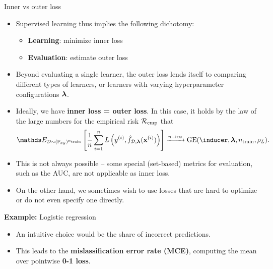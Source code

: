 \begin{vbframe}{Inner vs outer loss}

\begin{itemize}
  \item Supervised learning thus implies the following dichotomy:
  \begin{itemize}
    \item \textbf{Learning}: minimize inner loss
    \item \textbf{Evaluation}: estimate outer loss
  \end{itemize}
  \item Beyond evaluating a single learner, the outer loss lends itself to
  comparing different types of learners, or learners with varying hyperparameter
  configurations $\bm{\lambda}$.
  \item Ideally, we have \textbf{inner loss = outer loss}. In this case, it holds by the law of the large numbers for the empirical risk $\mathcal{R}_{\text{emp}}$ that
  $$\E_{\D\sim(\Pxy)^{\ntrain}}\left[\frac{1}{n}\sumin L\left(\yi, \fhDlam(\xi)\right)  \right] \xrightarrow{n \to \infty} \GE(\inducer, \lamv, \ntrain, \rhoL) .$$
  \item This is not always possible -- some special (set-based) metrics for 
  evaluation, such as the AUC, are not applicable as inner loss.
  \item On the other hand, we sometimes wish to use losses that are 
  hard to optimize or do not even specify one directly.
\end{itemize}

\framebreak

\textbf{Example:} Logistic regression

\begin{itemize}
  \item An intuitive choice would be the share of incorrect predictions.
  \item This leads to the \textbf{mislassification error rate (MCE)}, computing
  the mean over pointwise \textbf{0-1 loss}.
\end{itemize}

\lz


\end{vbframe}

